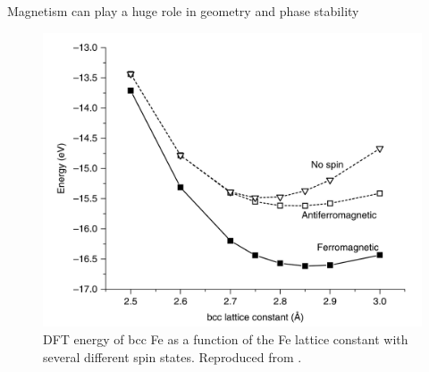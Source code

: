 \documentclass[aspectratio=169]{beamer}
\begin{document}
    \begin{frame}{Magnetism can play a huge role in geometry and phase stability}
        \begin{figure}
            \centering
            \includegraphics[width=0.5\linewidth]{lectures/figures/8_magnetism_Fe.png}
            \caption{DFT energy of bcc Fe as a function of the Fe lattice constant with several different spin states. Reproduced from \cite{shollDensityFunctionalTheory2023}.}
        \end{figure}
    \end{frame}
\end{document}
